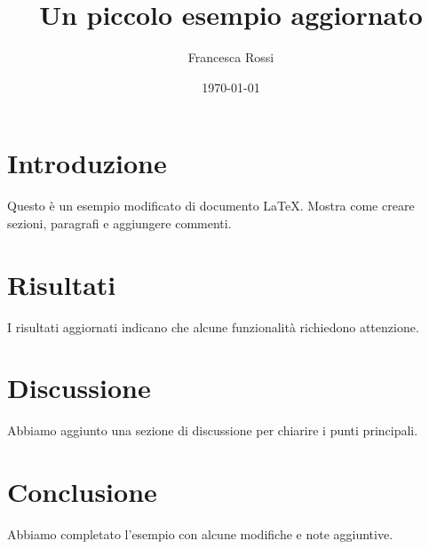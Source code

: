 \documentclass{article}
\title{Un piccolo esempio aggiornato}
\author{Francesca Rossi}
\date{\today}
\begin{document}
\maketitle

\section{Introduzione}
Questo è un esempio modificato di documento LaTeX.  
Mostra come creare sezioni, paragrafi e aggiungere commenti.

\section{Risultati}
I risultati aggiornati indicano che alcune funzionalità richiedono attenzione.

\section{Discussione}
Abbiamo aggiunto una sezione di discussione per chiarire i punti principali.

\section{Conclusione}
Abbiamo completato l'esempio con alcune modifiche e note aggiuntive.
\end{document}
